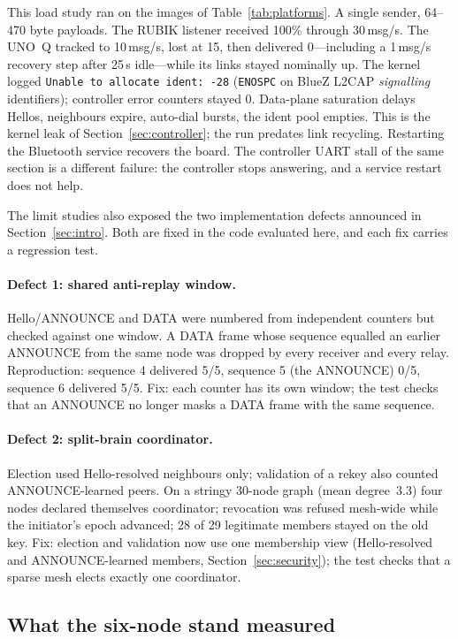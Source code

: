 \documentclass[conference,10pt]{IEEEtran}
\begin{document}
This load study ran on the images of Table~\ref{tab:platforms}. A single
sender, 64--470 byte payloads. The RUBIK listener received
100\% through 30\,msg/s. The UNO~Q tracked to 10\,msg/s, lost at 15, then
delivered 0---including a 1\,msg/s recovery step after 25\,s idle---while
its links stayed nominally up. The kernel logged
\texttt{Unable to allocate ident: -28} (\texttt{ENOSPC} on BlueZ L2CAP
\emph{signalling} identifiers); controller error counters stayed 0.
Data-plane saturation delays Hellos, neighbours expire, auto-dial
bursts, the ident pool empties. This is the kernel leak of
Section~\ref{sec:controller}; the run predates link recycling. Restarting
the Bluetooth service recovers the board. The controller UART stall of
the same section is a different failure: the controller stops answering,
and a service restart does not help.

The limit studies also exposed the two implementation defects announced
in Section~\ref{sec:intro}. Both are fixed in the code evaluated here, and each fix
carries a regression test.

\paragraph{Defect 1: shared anti-replay window.}
Hello/ANNOUNCE and DATA were numbered from independent counters but
checked against one window. A DATA frame whose sequence equalled an
earlier ANNOUNCE from the same node was dropped by every receiver and
every relay. Reproduction: sequence 4 delivered 5/5, sequence 5 (the
ANNOUNCE) 0/5, sequence 6 delivered 5/5. Fix: each counter has its own
window; the test checks that an ANNOUNCE no
longer masks a DATA frame with the same sequence.

\paragraph{Defect 2: split-brain coordinator.}
Election used Hello-resolved neighbours only; validation of a rekey also
counted ANNOUNCE-learned peers. On a stringy 30-node graph (mean
degree~3.3) four nodes declared themselves coordinator; revocation was
refused mesh-wide while the initiator's epoch advanced; 28 of 29
legitimate members stayed on the old key. Fix: election and validation
now use one membership view (Hello-resolved and ANNOUNCE-learned
members, Section~\ref{sec:security}); the test checks that a sparse mesh
elects exactly one coordinator.

\subsection{What the six-node stand measured}
\label{sec:plan}
\end{document}
